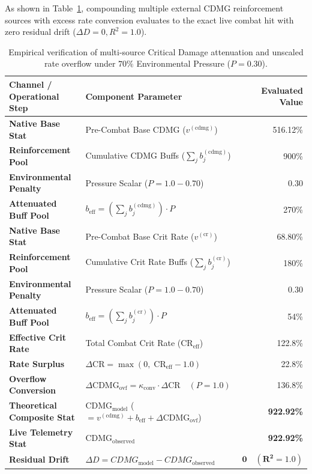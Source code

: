 \documentclass[twocolumn,10pt]{article}
\begin{document}
As shown in Table~\ref{tab:cdmg_pressure_verification}, compounding multiple external CDMG reinforcement sources with excess rate conversion evaluates to the exact live combat hit with zero residual drift ($\Delta D = 0, R^2 = 1.0$).

\begin{table}[H]
\centering
\small
\setlength{\tabcolsep}{5pt}
\begin{tabular}{llr}
\toprule
\textbf{Channel / Operational Step} & \textbf{Component Parameter} & \textbf{Evaluated Value} \\
\midrule
\textbf{Native Base Stat}       & Pre-Combat Base CDMG ($v^{(\text{cdmg})}$)             & 516.12\% \\
\textbf{Reinforcement Pool}     & Cumulative CDMG Buffs ($\sum_j b_j^{(\text{cdmg})}$)    & 900\% \\
\textbf{Environmental Penalty}  & Pressure Scalar ($P = 1.0 - 0.70$)                    & $0.30$ \\
\textbf{Attenuated Buff Pool}   & $b_{\text{eff}} = \left(\sum_j b_j^{(\text{cdmg})}\right) \cdot P$ & 270\% \\
\midrule
\textbf{Native Base Stat}       & Pre-Combat Base Crit Rate ($v^{(\text{cr})}$)             & 68.80\% \\
\textbf{Reinforcement Pool}     & Cumulative Crit Rate Buffs ($\sum_j b_j^{(\text{cr})}$)    & 180\% \\
\textbf{Environmental Penalty}  & Pressure Scalar ($P = 1.0 - 0.70$)                    & $0.30$ \\
\textbf{Attenuated Buff Pool}   & $b_{\text{eff}} = \left(\sum_j b_j^{(\text{cr})}\right) \cdot P$ & 54\% \\
\textbf{Effective Crit Rate}    & Total Combat Crit Rate ($\text{CR}_{\text{eff}}$)             & 122.8\% \\
\textbf{Rate Surplus}           & $\Delta \text{CR} = \max(0, \; \text{CR}_{\text{eff}} - 1.0)$ & 22.8\% \\
\textbf{Overflow Conversion}    & $\Delta \text{CDMG}_{\text{ovf}} = \kappa_{\text{conv}} \cdot \Delta \text{CR} \quad (P = 1.0)$ & 136.8\% \\
\midrule
\textbf{Theoretical Composite Stat} & $\text{CDMG}_{\text{model}}$ ($= v^{(\text{cdmg})} + b_{\text{eff}} + \Delta \text{CDMG}_{\text{ovf}}$) & \textbf{922.92\%} \\
\textbf{Live Telemetry Stat}    & $\text{CDMG}_{\text{observed}}$     & \textbf{922.92\%} \\
\midrule\midrule
\textbf{Residual Drift}         & $\Delta D = CDMG_{\text{model}} - CDMG_{\text{observed}}$    & $\mathbf{0 \quad (R^2 = 1.0)}$ \\
\bottomrule
\end{tabular}
\caption{Empirical verification of multi-source Critical Damage attenuation and unscaled rate overflow under $70\%$ Environmental Pressure ($P = 0.30$).}
\label{tab:cdmg_pressure_verification}
\end{table}
\end{document}
